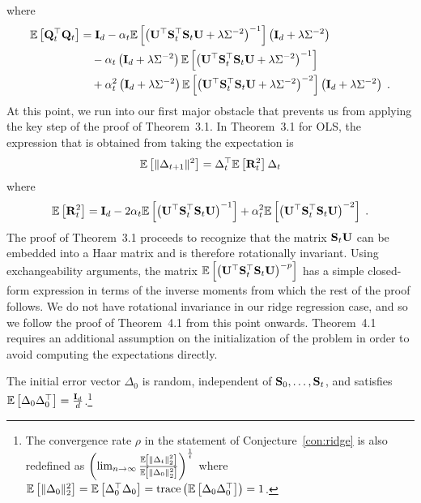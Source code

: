 where
\begin{align*}
\mathbb{E}\left[\mathbf{Q}_t^\top\mathbf{Q}_t\right] &= \mathbf{I}_d - \alpha_t\mathbb{E}\left[\left(\mathbf{U}^\top\mathbf{S}_t^\top\mathbf{S}_t\mathbf{U} + \lambda\Sigma^{-2}\right)^{-1}\right]\left(\mathbf{I}_d + \lambda\Sigma^{-2}\right) \\
&\quad - \alpha_t\left(\mathbf{I}_d + \lambda\Sigma^{-2}\right)\mathbb{E}\left[\left(\mathbf{U}^\top\mathbf{S}_t^\top\mathbf{S}_t\mathbf{U} + \lambda\Sigma^{-2}\right)^{-1}\right] \\
&\quad + \alpha_t^2\left(\mathbf{I}_d + \lambda\Sigma^{-2}\right)\mathbb{E}\left[\left(\mathbf{U}^\top\mathbf{S}_t^\top\mathbf{S}_t\mathbf{U} + \lambda\Sigma^{-2}\right)^{-2}\right]\left(\mathbf{I}_d + \lambda\Sigma^{-2}\right) \;.
\end{align*}
At this point, we run into our first major obstacle that prevents us from applying the key step of the proof of Theorem~3.1. In Theorem~3.1 for OLS, the expression that is obtained from taking the expectation is
\[
\mathbb{E}\left[\|\Delta_{t+1}\|^2\right] = \Delta_t^\top\mathbb{E}\left[\mathbf{R}_t^2\right]\Delta_t
\]
where
\[
\mathbb{E}\left[\mathbf{R}_t^2\right] = \mathbf{I}_d - 2\alpha_t\mathbb{E}\left[\left(\mathbf{U}^\top\mathbf{S}_t^\top\mathbf{S}_t\mathbf{U}\right)^{-1}\right] + \alpha_t^2\mathbb{E}\left[\left(\mathbf{U}^\top\mathbf{S}_t^\top\mathbf{S}_t\mathbf{U}\right)^{-2}\right] \;.
\]
The proof of Theorem~3.1 proceeds to recognize that the matrix $\mathbf{S}_t\mathbf{U}$ can be embedded into a Haar matrix and is therefore rotationally invariant. Using exchangeability arguments, the matrix $\mathbb{E}\left[\left(\mathbf{U}^\top\mathbf{S}_t^\top\mathbf{S}_t\mathbf{U}\right)^{-p}\right]$ has a simple closed-form expression in terms of the inverse moments from which the rest of the proof follows. We do not have rotational invariance in our ridge regression case, and so we follow the proof of Theorem~4.1 from this point onwards. Theorem~4.1 requires an additional assumption on the initialization of the problem in order to avoid computing the expectations directly.

\begin{assumption} \label{asp:initialization}
The initial error vector $\Delta_0$ is random, independent of $\mathbf{S}_0,\ldots,\mathbf{S}_t$, and satisfies $\mathbb{E}\left[\Delta_0\Delta_0^\top\right]=\frac{\mathbf{I}_d}{d}$.\footnote{The convergence rate $\rho$ in the statement of Conjecture~\ref{con:ridge} is also redefined as $\left(\lim_{n\rightarrow\infty}\frac{\mathbb{E}\left[\|\Delta_t\|_2^2\right]}{\mathbb{E}\left[\|\Delta_0\|_2^2\right]}\right)^\frac{1}{t}$ where $\mathbb{E}\left[\|\Delta_0\|_2^2\right]=\mathbb{E}\left[\Delta_0^\top\Delta_0\right]=\mathrm{trace}\left(\mathbb{E}\left[\Delta_0\Delta_0^\top\right]\right)=1$.}
\end{assumption}

